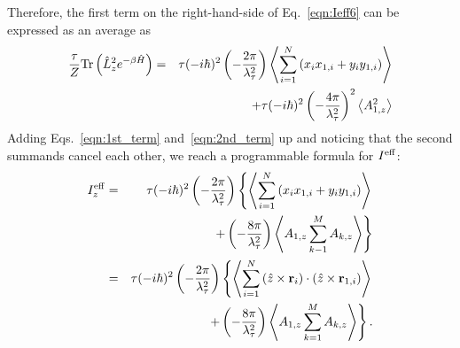 \documentclass[12pt]{iopart}
\begin{document}
Therefore, the first term on the right-hand-side of Eq.~\ref{eqn:Ieff6} can be expressed as an average  as
\begin{eqnarray}
\frac{\tau}{Z}{\rm Tr}\left(\hat{L}_z^2e^{-\beta\hat{H}} \right)&=&\tau(-i\hbar)^2\left( -\frac{2\pi}{\lambda_\tau^2} \right)\left< \sum_{i=1}^N \left(x_ix_{1,i}+y_iy_{1,i} \right) \right>\nonumber\\
&&+\tau(-i\hbar)^2\left( -\frac{4\pi}{\lambda_{\tau}^2} \right)^2\left<A_{1,z}^2 \right> \label{eqn:1st_term}
\end{eqnarray}
Adding Eqs.~\ref{eqn:1st_term} and~\ref{eqn:2nd_term} up and noticing that the second summands  cancel each other, we reach a programmable formula for $I^{\rm eff}$:
\begin{eqnarray}
I^{{\rm eff}}_z&=&\tau (-i\hbar)^2\left(-\frac{2\pi}{\lambda_\tau^2} \right)\left\{ \left< \sum_{i=1}^N \left(x_ix_{1,i}+y_iy_{1,i} \right) \right> \right.\nonumber\\
&&\left.+\left(-\frac{8\pi}{\lambda_\tau^2} \right)\left<A_{1,z}\sum_{k-1}^MA_{k,z} \right> \right\}\nonumber\\
&=&\tau (-i\hbar)^2\left(-\frac{2\pi}{\lambda_\tau^2} \right)\left\{ \left< \sum_{i=1}^N\left(\hat{z}\times{\bf r}_i \right)\cdot\left(\hat{z}\times{\bf r}_{1,i} \right) \right>\right.\nonumber\\
&&\left. +\left(-\frac{8\pi}{\lambda_\tau^2} \right)\left<A_{1,z}\sum_{k=1}^MA_{k,z} \right>\right\}. \label{eqn:Ieff7}
\end{eqnarray}
\end{document}
